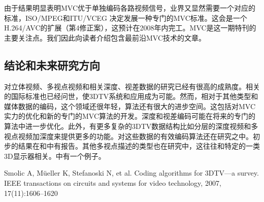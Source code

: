 由于结果明显表明MVC优于单独编码各路视频信号，业界又显然需要一个对应的标准，ISO/MPEG和ITU/VCEG 决定发展一种专门的MVC标准\cite{vetro-joint, vetro2006joint}。这会是一个H.264/AVC的扩展（第4修正案），这预计在2008年内完工。MVC是这一期特刊的主要关注点。我们因此向读者介绍包含最前沿MVC技术的文章。

\subsection{结论和未来研究方向}

对立体视频、多视点视频和相关深度、视差数据的研究已经有很高的成熟度。相关的国际标准也已经问世，使3DTV系统和应用成为可能。然而，相对于其他类型和媒体数据的编码，这个领域还很年轻，算法还有很大的进步空间。这包括对MVC实力的优化和新的专门的MVC算法的开发。深度和视差编码可能在将来的专门的算法中进一步优化。此外，有更多复杂的3DTV数据结构比如分层的深度视频和多视点视频加深度来提供更多的功能。对这些数据的有效编码算法还在研究之中。初步的结果在和中有报告。其他多视点描述的类型也在研究中，这往往和特定的一类3D显示器相关。中有一个例子。

\begin{center}
\end{center}

Smolic A, M{\"u}eller K, Stefanoski N, et al. Coding algorithms for 3DTV—a survey. IEEE transactions on circuits and systems for video technology, 2007, 17(11):1606–1620

